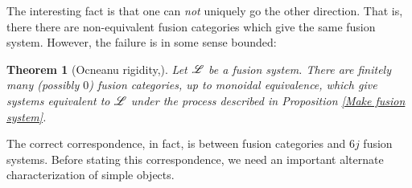 \documentclass{article}
\newtheorem{theorem}{Theorem}[section]
\theoremstyle{definition}
\numberwithin{figure}{section}
\begin{document}
The interesting fact is that one can \textit{not} uniquely go the other direction. That is, there there are non-equivalent fusion categories which give the same fusion system. However, the failure is in some sense bounded:

\begin{theorem}[Ocneanu rigidity,\cite{gainutdinov2023davydov}] Let $\mathscr{L}$ be a fusion system. There are finitely many (possibly $0$) fusion categories, up to monoidal equivalence, which give systems equivalent to $\mathscr{L}$ under the process described in Proposition \ref{Make fusion system}.
\end{theorem}

The correct correspondence, in fact, is between fusion categories and $6j$ fusion systems. Before stating this correspondence, we need an important alternate characterization of simple objects.
\end{document}
